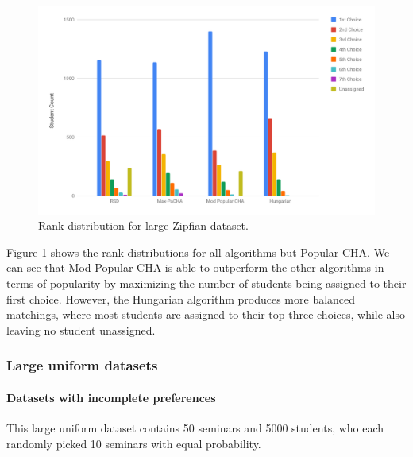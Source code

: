 \begin{figure}[h!]
  \centering
    \includegraphics[width=0.9\linewidth]{assets/plots/zipfian-medium.pdf}
    \caption{Rank distribution for large Zipfian dataset.}
    \label{fig:zipfian-medium-distribution}
\end{figure}

Figure \ref{fig:zipfian-medium-distribution} shows the rank distributions for all algorithms but Popular-CHA. We can see that Mod Popular-CHA is able to outperform the other algorithms in terms of popularity by maximizing the number of students being assigned to their first choice. However, the Hungarian algorithm produces more balanced matchings, where most students are assigned to their top three choices, while also leaving no student unassigned.

\subsubsection{Large uniform datasets}

\paragraph{Datasets with incomplete preferences}
This large uniform dataset contains 50 seminars and 5000 students, who each randomly picked 10 seminars with equal probability.  


